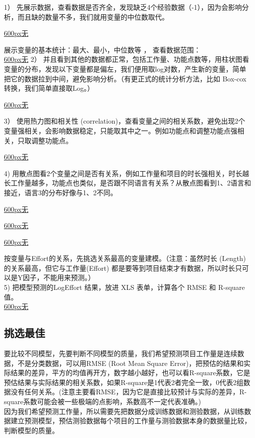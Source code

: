 1）
先展示数据，查看数据是否齐全，发现缺乏4个经验数据（-1），因为会影响分析，而且缺的数量不多，我们就用变量的中位数取代。

\href{文件:Screenshotfrom2025-02-261-00-34.png}{600px\textbar{}无}

展示变量的基本统计：最大、最小，中位数等 ， 查看数据范围：\\
\href{文件:Screenshotfrom2025-02-2621-00-45.png}{600px\textbar{}无} 2）
并且看到其他的数据都正常，包括工作量、功能点数等，用柱状图看变量的分布，发现以下变量都是偏左，我们便用取log对数，产生新的变量，简单把它的数据拉到中间，避免影响分析。（有更正式的统计分析方法，比如
Box-cox 转换，我们简单直接取Log。）

\href{文件:Screenshotfrom2025-03-0701-05-17.png}{600px\textbar{}无}

3） 使用热力图和相关性
(correlation)，查看变量之间的相关系数，避免出现2个变量强相关，会影响数据稳定，只能取其中之一。例如功能点和调整功能点强相关，只取调整功能点。

\href{文件:Screenshotfrom2025-03-0701-07-33.png}{600px\textbar{}无}

4)
用散点图看2个变量之间是否有关系，例如工作量和项目的时长强相关，时长越长工作量越多，功能点也类似，是否跟不同语言有关系？从散点图看到1、2语言和接近，语言3的分布好像与1、2不同。

\href{文件:Screenshotfrom2025-02-2621-09-21.png}{600px\textbar{}无}

\href{文件:Screenshotfrom2025-03-0701-23-20.png}{600px\textbar{}无}

\href{文件:Screenshotfrom2025-02-2614-18-55.png}{600px\textbar{}无}

按变量与Effort的关系，先挑选关系最高的变量建模。（注意：虽然时长
(Length) 的关系最高，但它与工作量(Effort)
都是要等到项目结束才有数据，所以时长只可以是Y因子，不能用来预测。）\\
5) 把模型预测的LogEffort 结果，放进 XLS 表单，计算各个 RMSE 和 R-square
值。\\
\href{文件:Calculate_RMSE_Screenshot_2025-03-08_155658.jpg}{600px\textbar{}无}

\hypertarget{ux6311ux9009ux6700ux4f73}{%
\subsection{挑选最佳}\label{ux6311ux9009ux6700ux4f73}}

要比较不同模型，先要判断不同模型的质量，我们希望预测项目工作量是连续数据，不是分类数据，可以用RMSE
(Root Mean Square
Error)，把预估的结果和实际结果的差异，平方的均值再开方，数字越小越好，也可以看R-square系数，它是预估结果与实际结果的相关系数，如果R-square是1代表2者完全一致，0代表2组数据没有任何关系。(注意主要看RMSE，因为它是直接比较预计与实际的差异，R-square系数可能会被一些极端的点影响，系数高不一定代表准确。)\\
因为我们希望预测工作量，所以需要先把数据分成训练数据和测验数据，从训练数据建立预测模型，预估测验数据每个项目的工作量与测验数据本身的数据量比较，判断模型的质量。

